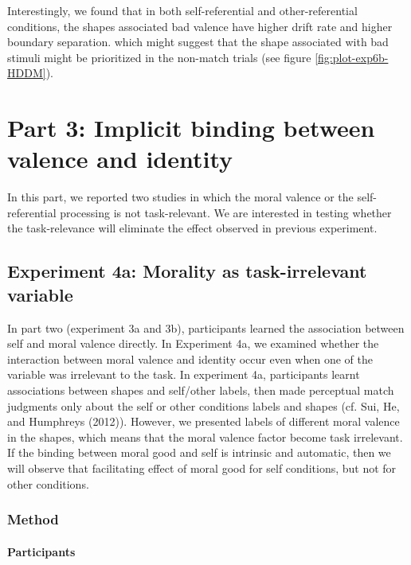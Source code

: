 \documentclass[
  english,
  man]{apa6}
\let\oldparagraph\paragraph
\renewcommand{\paragraph}[1]{\oldparagraph{#1}\mbox{}}
\begin{document}
Interestingly, we found that in both self-referential and other-referential conditions, the shapes associated bad valence have higher drift rate and higher boundary separation. which might suggest that the shape associated with bad stimuli might be prioritized in the non-match trials (see figure \ref{fig:plot-exp6b-HDDM}).

\hypertarget{part-3-implicit-binding-between-valence-and-identity}{%
\section{Part 3: Implicit binding between valence and identity}\label{part-3-implicit-binding-between-valence-and-identity}}

In this part, we reported two studies in which the moral valence or the self-referential processing is not task-relevant. We are interested in testing whether the task-relevance will eliminate the effect observed in previous experiment.

\hypertarget{experiment-4a-morality-as-task-irrelevant-variable}{%
\subsection{Experiment 4a: Morality as task-irrelevant variable}\label{experiment-4a-morality-as-task-irrelevant-variable}}

In part two (experiment 3a and 3b), participants learned the association between self and moral valence directly. In Experiment 4a, we examined whether the interaction between moral valence and identity occur even when one of the variable was irrelevant to the task. In experiment 4a, participants learnt associations between shapes and self/other labels, then made perceptual match judgments only about the self or other conditions labels and shapes (cf. Sui, He, and Humphreys (2012)). However, we presented labels of different moral valence in the shapes, which means that the moral valence factor become task irrelevant. If the binding between moral good and self is intrinsic and automatic, then we will observe that facilitating effect of moral good for self conditions, but not for other conditions.

\hypertarget{method-6}{%
\subsubsection{Method}\label{method-6}}

\hypertarget{participants-8}{%
\paragraph{Participants}\label{participants-8}}
\end{document}

